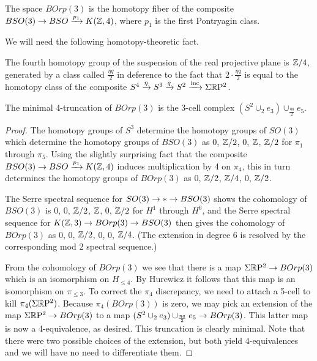 \documentclass{amsart}
\begin{document}
\begin{definition}[$BOrp(3)$]
The space $BOrp(3)$ is the homotopy fiber of the composite $BSO(3) \rightarrow BSO \xrightarrow{p_1} K(\mathbb Z,4)$, where $p_1$ is the first Pontryagin class.
\end{definition}

We will need the following homotopy-theoretic fact.
\begin{proposition}[$\pi_4(\Sigma \RP^2)$]
The fourth homotopy group of the suspension of the real projective plane is $\mathbb Z/4$, generated by a class called $\frac{\eta q}{2}$ in deference to the fact that $2 \cdot \frac{\eta q}{2}$ is equal to the homotopy class of the composite $S^4 \xrightarrow{\eta} S^3 \xrightarrow{q} S^2 \xrightarrow{\text{inc}} \Sigma \mathbb R \mathrm{P}^2$.
\end{proposition}

\begin{proposition} 
\label{prop-borptrunc}
The minimal 4-truncation of $BOrp(3)$ is the 3-cell complex $(S^2 \cup_2 e_3) \cup_{\frac{\eta q}{2}} e_5$.
\end{proposition}
\begin{proof}
The homotopy groups of $S^3$ determine the homotopy groups of $SO(3)$ which determine the homotopy groups of $BSO(3)$ as $0$, $\mathbb Z/2$, $0$, $\mathbb Z$, $\mathbb Z/2$ for $\pi_1$ through $\pi_5$.  Using the slightly surprising fact that the composite $BSO(3) \rightarrow BSO \xrightarrow{p_1} K(\mathbb Z,4)$ induces multiplication by 4 on $\pi_4$, this in turn determines the homotopy groups of $BOrp(3)$ as $0$, $\mathbb Z/2$, $\mathbb Z/4$, $0$, $\mathbb Z/2$.  

The Serre spectral sequence for $SO(3) \rightarrow * \rightarrow BSO(3)$ shows the cohomology of $BSO(3)$ is $0$, $0$, $\mathbb Z/2$, $\mathbb Z$, $0$, $\mathbb Z/2$ for $H^1$ through $H^6$, and the Serre spectral sequence for $K(\mathbb Z,3) \rightarrow BOrp(3) \rightarrow BSO(3)$ then gives the cohomology of $BOrp(3)$ as $0$, $0$, $\mathbb Z/2$, $0$, $0$, $\mathbb Z/4$.  (The extension in degree 6 is resolved by the corresponding mod 2 spectral sequence.)

From the cohomology of $BOrp(3)$ we see that there is a map $\Sigma \mathbb R \mathrm{P}^2 \rightarrow BOrp(3)$ which is an isomorphism on $H_{\leq 4}$.  By Hurewicz it follows that this map is an isomorphism on $\pi_{\leq 3}$.  To correct the $\pi_4$ discrepancy, we need to attach a 5-cell to kill $\pi_4(\Sigma \RP^2)$.  Because $\pi_4(BOrp(3))$ is zero, we may pick an extension of the map $\Sigma \mathbb R \mathrm{P}^2 \rightarrow BOrp(3)$ to a map $(S^2 \cup_2 e_3) \cup_{\frac{\eta q}{2}} e_5 \rightarrow BOrp(3)$.  This latter map is now a 4-equivalence, as desired.  This truncation is clearly minimal.  Note that there were two possible choices of the extension, but both yield 4-equivalences and we will have no need to differentiate them.
\end{proof}
\end{document}
